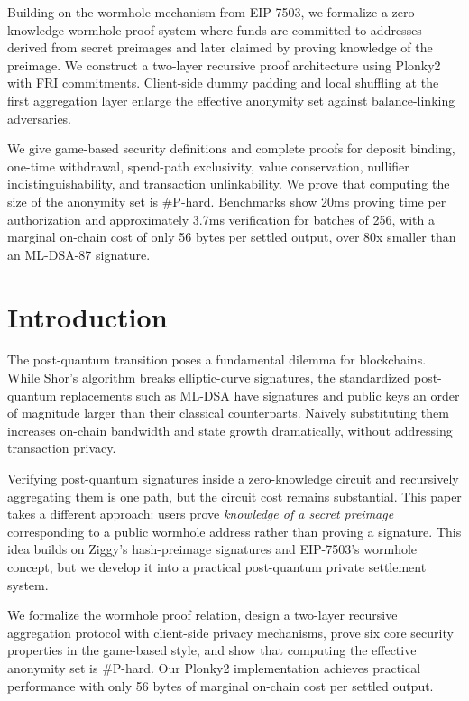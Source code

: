 \documentclass{iacrcc}
\begin{document}
\begin{textabstract}
Building on the wormhole mechanism from EIP-7503, we formalize a zero-knowledge wormhole proof system where funds are committed to addresses derived from secret preimages and later claimed by proving knowledge of the preimage. We construct a two-layer recursive proof architecture using Plonky2 with FRI commitments. Client-side dummy padding and local shuffling at the first aggregation layer enlarge the effective anonymity set against balance-linking adversaries.

We give game-based security definitions and complete proofs for deposit binding, one-time withdrawal, spend-path exclusivity, value conservation, nullifier indistinguishability, and transaction unlinkability. We prove that computing the size of the anonymity set is #P-hard. Benchmarks show 20ms proving time per authorization and approximately 3.7ms verification for batches of 256, with a marginal on-chain cost of only 56 bytes per settled output, over 80x smaller than an ML-DSA-87 signature.
\end{textabstract}

\section{Introduction}

The post-quantum transition poses a fundamental dilemma for blockchains. While Shor's algorithm breaks elliptic-curve signatures, the standardized post-quantum replacements such as ML-DSA have signatures and public keys an order of magnitude larger than their classical counterparts. Naively substituting them increases on-chain bandwidth and state growth dramatically, without addressing transaction privacy.

Verifying post-quantum signatures inside a zero-knowledge circuit and recursively aggregating them is one path, but the circuit cost remains substantial. This paper takes a different approach: users prove \emph{knowledge of a secret preimage} corresponding to a public wormhole address rather than proving a signature. This idea builds on Ziggy's hash-preimage signatures and EIP-7503's wormhole concept, but we develop it into a practical post-quantum private settlement system.

We formalize the wormhole proof relation, design a two-layer recursive aggregation protocol with client-side privacy mechanisms, prove six core security properties in the game-based style, and show that computing the effective anonymity set is \#P-hard. Our Plonky2 implementation achieves practical performance with only 56 bytes of marginal on-chain cost per settled output.
\end{document}
